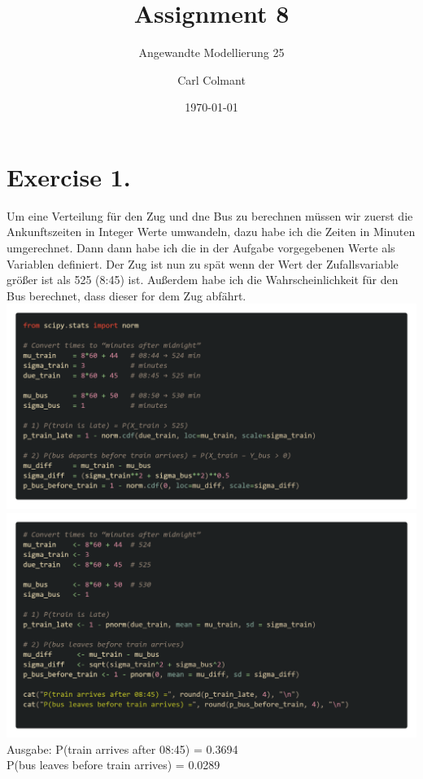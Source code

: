 \documentclass{scrartcl}
\title{Assignment 8}
\subtitle{Angewandte Modellierung 25}
\author{Carl Colmant}
\date{\today}
\begin{document}
\maketitle
\newpage
\section*{Exercise 1. }
Um eine Verteilung für den Zug und dne Bus zu berechnen müssen wir zuerst die Ankunftszeiten in Integer Werte umwandeln, dazu habe ich die Zeiten in Minuten umgerechnet. Dann dann habe ich die in der Aufgabe vorgegebenen Werte als Variablen definiert. Der Zug ist nun zu spät wenn der Wert der Zufallsvariable größer ist als 525 (8:45) ist. Außerdem habe ich die Wahrscheinlichkeit für den Bus berechnet, dass dieser for dem Zug abfährt.\\
\includegraphics*[scale=0.24]{Bus_pi.png}\\
\includegraphics*[scale=0.24]{Bus_R.png}\\
Ausgabe: 
P(train arrives after 08:45) = 0.3694\\
P(bus leaves before train arrives) = 0.0289
\end{document}
